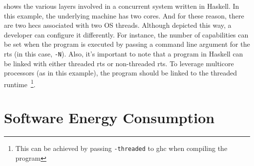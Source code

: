  shows the various layers involved in a concurrent system written in Haskell. In this example, the underlying machine has two cores. And for these reason, there are two \acp{hec} associated with two OS threads. Although depicted this way, a developer can configure it differently. For instance, the number of capabilities can be set when the program is executed  by passing a command line argument for the \ac{rts} (in this case, \texttt{-N}). Also, it's important to note that a program in Haskell can be linked with either threaded \ac{rts} or non-threaded \ac{rts}. To leverage multicore processors (as in this example), the program should be linked to the threaded runtime~\footnote{This can be achieved by passing \texttt{-threaded} to \ac{ghc} when compiling the program}.






\section{Software Energy Consumption}
\lipsum[1-4]
